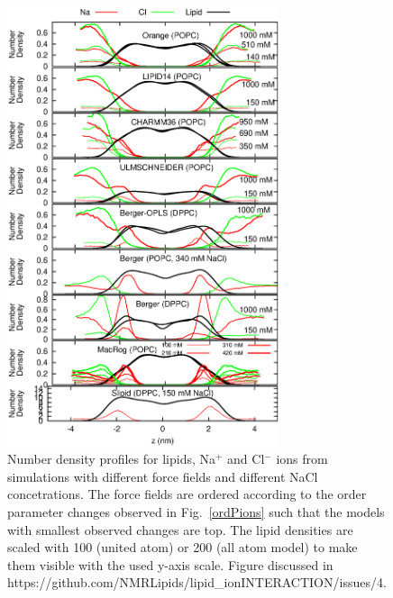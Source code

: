 \documentclass[pre,aps,floatfix,authordate1-4,twocolumn]{revtex4-1}
\begin{document}
\begin{figure}[]
  \centering
  \includegraphics[width=8cm]{../Fig/NAdensities.eps}
  \caption{\label{NAdensities}
    Number density profiles for lipids, Na$^+$ and Cl$^-$ ions from simulations with different force fields and different NaCl concetrations. 
    The force fields are ordered according to the order parameter changes observed in Fig.~\ref{ordPions} such that the models with smallest
    observed changes are top.
    The lipid densities are scaled with 100 (united atom) or 200 (all atom model) to make them visible with the used y-axis scale.
    Figure discussed in https://github.com/NMRLipids/lipid\_ionINTERACTION/issues/4.
  }
\end{figure}
\end{document}
